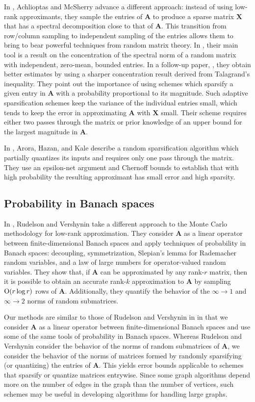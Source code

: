 \documentclass[11pt,letterpaper,twoside,reqno]{amsart}
\newcommand{\mat}[1]{\ensuremath{\bm{#1}}}
\newcommand{\infone}{\ensuremath{\infty\!\rightarrow\!\!1}}
\newcommand{\inftwo}{\ensuremath{\infty\!\rightarrow\!\!2}}
\newcommand{\asymO}[1]{\ensuremath{\mathop{\text{\rm O}}\!\left(#1\right)}}
\begin{document}
In \cite{AM01}, Achlioptas and McSherry advance a different approach: instead of using low-rank approximants, they sample the entries of $\mat{A}$ to produce a sparse matrix $\mat{X}$ that has a spectral decomposition close to that of $\mat{A}$. This transition from row/column sampling to independent sampling of the entries allows them to bring to bear powerful techniques from random matrix theory. In \cite{AM01}, their main tool is a result on the concentration of the spectral norm of a random matrix with independent, zero-mean, bounded entries. In a follow-up paper, \cite{AM07}, they obtain better estimates by using a sharper concentration result derived from Talagrand's inequality. They point out the importance of using schemes which sparsify a given entry in $\mat{A}$ with a probability proportional to its magnitude. Such adaptive sparsification schemes keep the variance of the individual entries small, which tends to keep the error in approximating $\mat{A}$ with $\mat{X}$ small. Their scheme requires either two passes through the matrix or prior knowledge of an upper bound for the largest magnitude in $\mat{A}$.

In \cite{AHK06}, Arora, Hazan, and Kale describe a random sparsification algorithm which partially quantizes its inputs and requires only one pass through the matrix. They use an epsilon-net argument and Chernoff bounds to establish that with high probability the resulting approximant has small error and high sparsity. 

\subsection{Probability in Banach spaces}
In \cite{RV07}, Rudelson and Vershynin take a different approach to the Monte Carlo methodology for low-rank approximation. They consider $\mat{A}$ as a linear operator between finite-dimensional Banach spaces and apply techniques of probability in Banach spaces: decoupling, symmetrization, Slepian's lemma for Rademacher random variables, and a law of large numbers for operator-valued random variables. They show that, if $\mat{A}$ can be approximated by any rank-$r$ matrix, then it is possible to obtain an accurate rank-$k$ approximation to $\mat{A}$ by sampling $\asymO{r\log r}$ rows of $\mat{A}$. Additionally, they quantify the behavior of the $\infone$ and $\inftwo$ norms of random submatrices.

Our methods are similar to those of Rudelson and Vershynin in \cite{RV07} in that we consider $\mat{A}$ as a linear operator between finite-dimensional Banach spaces and use some of the same tools of probability in Banach spaces. Whereas Rudelson and Vershynin consider the behavior of the norms of random submatrices of $\mat{A}$, we consider the behavior of the norms of matrices formed by randomly sparsifying (or quantizing) the entries of $\mat{A}$. This yields error bounds applicable to schemes that sparsify or quantize matrices entrywise. Since some graph algorithms depend more on the number of edges in the graph than the number of vertices, such schemes may be useful in developing algorithms for handling large graphs.
\end{document}

